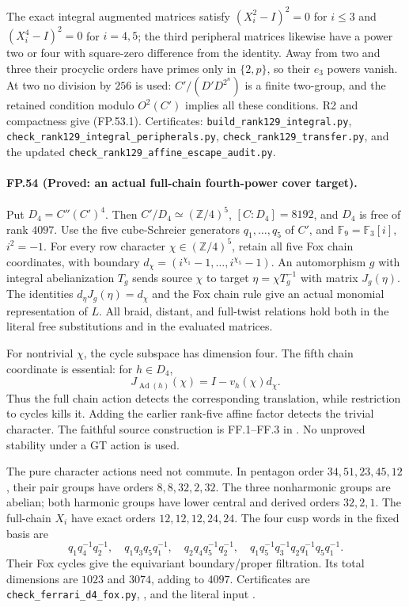 The exact integral augmented matrices satisfy
$(X_i^2-I)^2=0$ for $i\leq3$ and $(X_i^4-I)^2=0$ for $i=4,5$;
the third peripheral matrices likewise have a power two or four
with square-zero difference from the identity. Away from two and
three their procyclic orders have primes only in $\{2,p\}$, so
their $e_3$ powers vanish. At two no division by $256$ is used:
$C'/(D'D^{2^n})$ is a finite two-group, and the retained condition
modulo $O^2(C')$ implies all these conditions. R2 and compactness
give (FP.53.1). Certificates:
\texttt{build\_rank129\_integral.py},
\texttt{check\_rank129\_integral\_peripherals.py},
\texttt{check\_rank129\_transfer.py}, and the updated
\texttt{check\_rank129\_affine\_escape\_audit.py}.

\paragraph{FP.54 (Proved: an actual full-chain fourth-power cover target).}
Put $D_4=C''(C')^4$. Then $C'/D_4\simeq(\mathbb Z/4)^5$,
$[C:D_4]=8192$, and $D_4$ is free of rank $4097$.
Use the five cube-Schreier generators $q_1,\ldots,q_5$ of $C'$,
and $\mathbb F_9=\mathbb F_3[i]$, $i^2=-1$.
For every row character $\chi\in(\mathbb Z/4)^5$, retain all five
Fox chain coordinates, with boundary
$d_\chi=(i^{\chi_1}-1,\ldots,i^{\chi_5}-1)$.
An automorphism $g$ with integral abelianization $T_g$ sends source
$\chi$ to target $\eta=\chi T_g^{-1}$ with matrix $J_g(\eta)$.
The identities $d_\eta J_g(\eta)=d_\chi$ and the Fox chain rule
give an actual monomial representation of $L$.
All braid, distant, and full-twist relations hold both in the
literal free substitutions and in the evaluated matrices.

For nontrivial $\chi$, the cycle subspace has dimension four.
The fifth chain coordinate is essential: for $h\in D_4$,
\[
                  J_{\operatorname{Ad}(h)}(\chi)
                    =I-v_h(\chi)d_\chi.
 \tag{FP.54.1}
\]
Thus the full chain action detects the corresponding translation,
while restriction to cycles kills it. Adding the earlier rank-five
affine factor detects the trivial character. The faithful source
construction is FF.1--FF.3 in
.
No unproved stability under a GT action is used.

The pure character actions need not commute. In pentagon order
$34,51,23,45,12$, their pair groups have orders $8,8,32,2,32$.
The three nonharmonic groups are abelian; both harmonic groups
have lower central and derived orders $32,2,1$.
The full-chain $X_i$ have exact orders $12,12,12,24,24$.
The four cusp words in the fixed basis are
\[
 q_1q_4^{-1}q_2^{-1},\quad q_1q_3q_5q_1^{-1},\quad
 q_2q_4q_5^{-1}q_2^{-1},\quad
 q_1q_5^{-1}q_3^{-1}q_2q_1^{-1}q_5q_1^{-1}.
\]
Their Fox cycles give the equivariant boundary/proper filtration.
Its total dimensions are $1023$ and $3074$, adding to $4097$.
Certificates are \texttt{check\_ferrari\_d4\_fox.py},
, and the literal input
.

